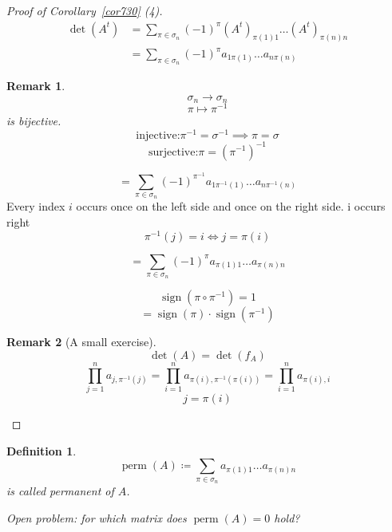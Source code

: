 \documentclass{article}
\newtheorem{definition}{Definition}  \numberwithin{definition}{section}
\newtheorem{remark}{Remark}  \numberwithin{remark}{section}
\DeclareMathOperator{\perm}{perm}
\DeclareMathOperator{\sign}{sign}
\begin{document}
\begin{proof}[Proof of Corollary~\ref{cor730} (4)]
  \begin{align*}
    \det(A^t) &= \sum_{\pi \in \sigma_n} (-1)^\pi (A^t)_{\pi(1) 1} \dots (A^t)_{\pi(n) n} \\
      &= \sum_{\pi \in \sigma_n} (-1)^\pi a_{1 \pi(1)} \dots a_{n \pi(n)}
  \end{align*}

  \begin{remark}
    \[ \sigma_n \to \sigma_n \]
    \[ \pi \mapsto \pi^{-1} \]
    is bijective.
    \[ \text{injective:} \pi^{-1} = \sigma^{-1} \implies \pi = \sigma \]
    \[ \text{surjective:} \pi = (\pi^{-1})^{-1} \]
  \end{remark}

  \[ = \sum_{\pi \in \sigma_n} (-1)^{\pi^{-1}} a_{1 \pi^{-1}(1)} \dots a_{n \pi^{-1}(n)} \]
  Every index $i$ occurs once on the left side and once on the right side. i occurs right
  \[ \pi^{-1}(j) = i  \iff  j = \pi(i) \]

  \[ = \sum_{\pi \in \sigma_n} (-1)^\pi a_{\pi(1) 1} \dots a_{\pi(n) n} \]

  \[ \sign(\pi \circ \pi^{-1}) = 1 \]
  \[ = \sign(\pi) \cdot \sign(\pi^{-1}) \]

  \begin{remark}[A small exercise]
    \[ \det(A) = \det(f_A) \]
    \[
      \prod_{j=1}^n a_{j, \pi^{-1}(j)}
      = \prod_{i=1}^n a_{\pi(i), \pi^{-1}(\pi(i))}
      = \prod_{i=1}^n a_{\pi(i), i}
    \] \[
      j = \pi(i)
    \]
  \end{remark}
\end{proof}

\begin{definition}
  \[ \perm(A) \coloneqq \sum_{\pi \in \sigma_n} a_{\pi(1) 1} \dots a_{\pi(n) n} \]
  is called \emph{permanent of $A$}.

  Open problem: for which matrix does $\perm(A) = 0$ hold?
\end{definition}
\end{document}

